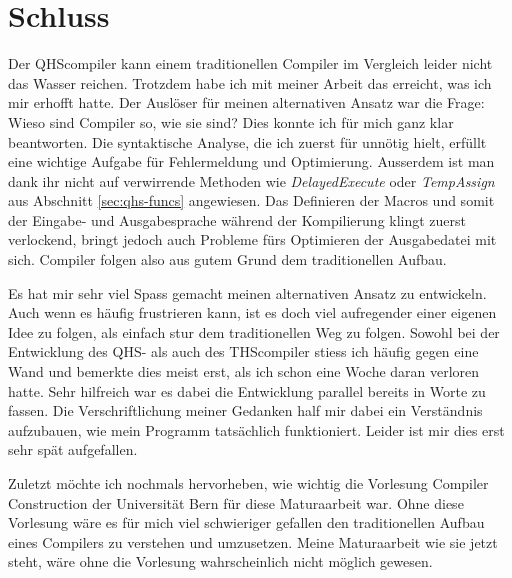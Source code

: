 \chapter{Schluss}
Der QHScompiler kann einem traditionellen Compiler im Vergleich leider nicht das Wasser reichen.
Trotzdem habe ich mit meiner Arbeit das erreicht, was ich mir erhofft hatte. Der Auslöser für meinen alternativen Ansatz war die Frage: Wieso sind Compiler so, wie sie sind? 
Dies konnte ich für mich ganz klar beantworten. Die syntaktische Analyse, die ich zuerst für unnötig hielt, erfüllt eine wichtige Aufgabe für Fehlermeldung und Optimierung.
Ausserdem ist man dank ihr nicht auf verwirrende Methoden wie \textit{DelayedExecute} oder \textit{TempAssign} aus Abschnitt \ref{sec:qhs-funcs} angewiesen.
Das Definieren der Macros und somit der Eingabe- und Ausgabesprache während der Kompilierung klingt zuerst verlockend, bringt jedoch auch Probleme fürs Optimieren der Ausgabedatei mit sich.
Compiler folgen also aus gutem Grund dem traditionellen Aufbau.

Es hat mir sehr viel Spass gemacht meinen alternativen Ansatz zu entwickeln. Auch wenn es häufig frustrieren kann, ist es doch viel aufregender einer eigenen Idee zu folgen, als einfach stur dem traditionellen Weg zu folgen.
Sowohl bei der Entwicklung des QHS- als auch des THScompiler stiess ich häufig gegen eine Wand und bemerkte dies meist erst, als ich schon eine Woche daran verloren hatte.
Sehr hilfreich war es dabei die Entwicklung parallel bereits in Worte zu fassen. Die Verschriftlichung meiner Gedanken half mir dabei ein Verständnis aufzubauen, wie mein Programm tatsächlich funktioniert.
Leider ist mir dies erst sehr spät aufgefallen.

Zuletzt möchte ich nochmals hervorheben, wie wichtig die Vorlesung Compiler Construction der Universität Bern \cite{Lecture} für diese Maturaarbeit war.
Ohne diese Vorlesung wäre es für mich viel schwieriger gefallen den traditionellen Aufbau eines Compilers zu verstehen und umzusetzen.
Meine Maturaarbeit wie sie jetzt steht, wäre ohne die Vorlesung wahrscheinlich nicht möglich gewesen.

